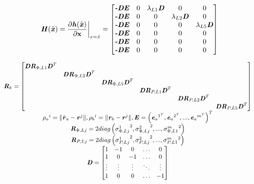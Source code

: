 \begin{equation}
	\textbf{\textit{H}}(\hat{\textbf{\textit{x}}}) = \frac{\partial \textbf{\textit{h}}(\hat{\textbf{\textit{x}}})}{\partial \textbf{x}} \bigg|_{x=\hat{x}} = \begin{bmatrix}
	    \textbf{\textit{-DE}} & 0 & \lambda_{L1}\textbf{\textit{D}} &0&0\\
	    \textbf{\textit{-DE}} & 0 & 0 &\lambda_{L2}\textbf{\textit{D}}&0\\
	    \textbf{\textit{-DE}} & 0 & 0 &0&\lambda_{L5}\textbf{\textit{D}}\\
	    \textbf{\textit{-DE}} & 0 & 0 &0&0\\
	    \textbf{\textit{-DE}} & 0 & 0 &0&0\\
	    \textbf{\textit{-DE}} & 0 & 0 &0&0\\
	\end{bmatrix}
	\label{eq:EKF_rtklib_H}
\end{equation}

\begin{equation}
\begin{matrix}
\textbf{\textit{R}}_{k} = \begin{bmatrix}
\textbf{\textit{D}}\textbf{\textit{R}}_{\Phi,L1}{\textbf{\textit{D}}}^{T} &&&&&\\
&\textbf{\textit{D}}\textbf{\textit{R}}_{\Phi,L2}{\textbf{\textit{D}}}^{T}&&&&\\
&&\textbf{\textit{D}}\textbf{\textit{R}}_{\Phi,L5}{\textbf{\textit{D}}}^{T}&&&\\
&&&\textbf{\textit{D}}\textbf{\textit{R}}_{P,L1}{\textbf{\textit{D}}}^{T}&&\\
&&&&\textbf{\textit{D}}\textbf{\textit{R}}_{P,L2}{\textbf{\textit{D}}}^{T}&\\
&&&&&\textbf{\textit{D}}\textbf{\textit{R}}_{P,L5}{\textbf{\textit{D}}}^{T}\\
\end{bmatrix}\\
{\rho_{a}}^{i}=\| \hat{\textbf{\textit{r}}}_{a} - \textbf{\textit{r}}^{j} \|,  {\rho_{b}}^{i}= \|\textbf{\textit{r}}_{b} - \textbf{\textit{r}}^{j}\|,  \textbf{\textit{E}}= \left({\textbf{\textit{e}}_{a}}^{1^{T}},{\textbf{\textit{e}}_{a}}^{2^{T}},...,{\textbf{\textit{e}}_{a}}^{m^{T}}  \right)^{T}\\
\textbf{\textit{R}}_{\Phi,Lj}= 2diag \left( {\sigma_{\Phi,Lj}^{1}}^{2}, {\sigma_{\Phi,Lj}^{2}}^{2},...,{\sigma_{\Phi,L1}^{m}}^{2}\right)\\
\textbf{\textit{R}}_{P,Lj}= 2diag \left( {\sigma_{P,Lj}^{1}}^{2}, {\sigma_{P,Lj}^{2}}^{2},...,{\sigma_{P,L1}^{m}}^{2}\right)\\

\textbf{\textit{D}}= \begin{bmatrix}
1&-1&0&\dots&0\\
1&0&-1&\dots&0\\
\vdots&\vdots&\vdots&\ddots&\vdots\\
1&0&0&\dots&-1\\
\end{bmatrix}

\end{matrix}
\\
\label{eq:EKF_rtklib_Rk}
\end{equation}

